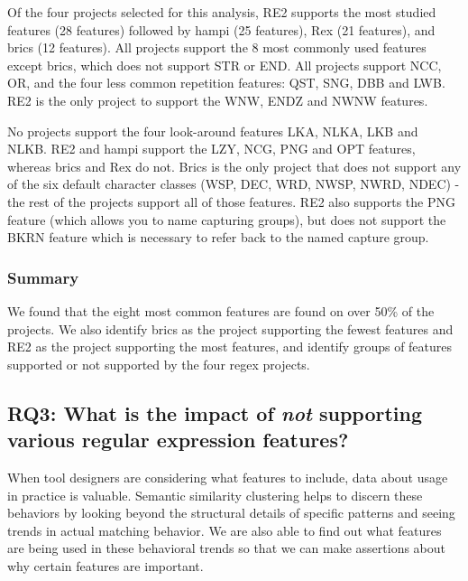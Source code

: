 

Of the four projects selected for this analysis, RE2 supports the most studied features (28 features) followed by hampi (25 features),  Rex (21 features), and brics (12 features).  All projects support the 8 most commonly used features except brics, which does not support STR or END.  All projects support NCC, OR, and the four less common repetition features: QST, SNG, DBB and LWB.  RE2 is the only project to support the WNW, ENDZ and NWNW features.

\leavevmode\color{gray}
No projects support the four look-around features LKA, NLKA, LKB and NLKB.  RE2 and hampi support the LZY, NCG, PNG and OPT features, whereas brics and Rex do not.  Brics is the only project that does not support any of the six default character classes (WSP, DEC, WRD, NWSP, NWRD, NDEC) - the rest of the projects support all of those features.  RE2 also supports the PNG feature (which allows you to name capturing groups), but does not support the BKRN feature which is necessary to refer back to the named capture group.
\leavevmode\color{black}

\subsubsection{Summary}
We found that the eight most common features are found on over 50\% of the projects.
We also identify brics as the project supporting the fewest features and RE2 as the project supporting the most features, and identify groups of features supported or not supported by the four regex projects.


\subsection{{RQ3:} What is the impact of \emph{not} supporting various regular expression features?}
\label{results:rq3}

When tool designers are considering what features to include, data about usage in practice is valuable.  Semantic similarity clustering  helps to discern these behaviors by looking beyond the structural details of specific patterns and seeing trends in actual matching behavior.  We are also able to find out what features are being used in these behavioral trends so that we can make assertions about why certain features are important.

